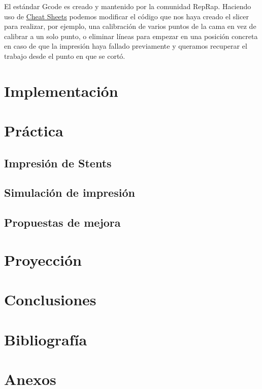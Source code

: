 \documentclass[a4paper,12pt]{article}
\begin{document}
El estándar Gcode es creado y mantenido por la comunidad RepRap. Haciendo uso de \href{https://thingiverse-production-new.s3.amazonaws.com/assets/87/b0/2c/f5/4c/CheatSheet.pdf}{Cheat Sheets} podemos modificar el código que nos haya creado el slicer para realizar, por ejemplo, una calibración de varios puntos de la cama en vez de calibrar a un solo punto, o eliminar líneas para empezar en una posición concreta en caso de que la impresión haya fallado previamente y queramos recuperar el trabajo desde el punto en que se cortó. 



\pagebreak
\section{Implementación}


\pagebreak
\section{Práctica}
\subsection{Impresión de Stents}
\subsection{Simulación de impresión}
\subsection{Propuestas de mejora}



\pagebreak
\section{Proyección}

\pagebreak
\section{Conclusiones}


\pagebreak
\section{Bibliografía}


\pagebreak
\section{Anexos}
\end{document}

